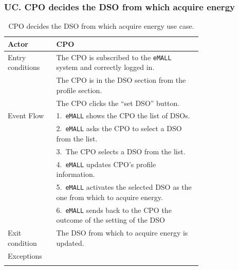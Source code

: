 \subsubsection*{UC\cuc . CPO decides the DSO from which acquire energy}
\begin{center}
    \begin{longtable}{lp{0.75\linewidth}}
        \hline
        Actor            & CPO                                                                                  \\
        \hline
        Entry conditions & The CPO is subscribed to the \verb|eMALL| system and correctly logged in.            \\
        & The CPO is in the DSO section from the profile section.                              \\
        & The CPO clicks the “set DSO” button.                                                 \\
        \hline
        Event Flow       & 1.\ \verb|eMALL| shows the CPO the list of DSOs.                                     \\
        & 2.\ \verb|eMALL| asks the CPO to select a DSO from the list.                         \\
        & 3.\ The CPO selects a DSO from the list.                                             \\
        & 4.\ \verb|eMALL| updates CPO’s profile information.                                  \\
        & 5.\ \verb|eMALL| activates the selected DSO as the one from which to acquire energy. \\
        & 6.\ \verb|eMALL| sends back to the CPO the outcome of the setting of the DSO         \\
        \hline
        Exit condition   & The DSO from which to acquire energy is updated.                                     \\
        \hline
        Exceptions       &                                                                                      \\
        \hline
        \caption{CPO decides the DSO from which acquire energy use case.}
        \label{tab: CPO_decides_DSO_use_case}
    \end{longtable}


\end{center}
